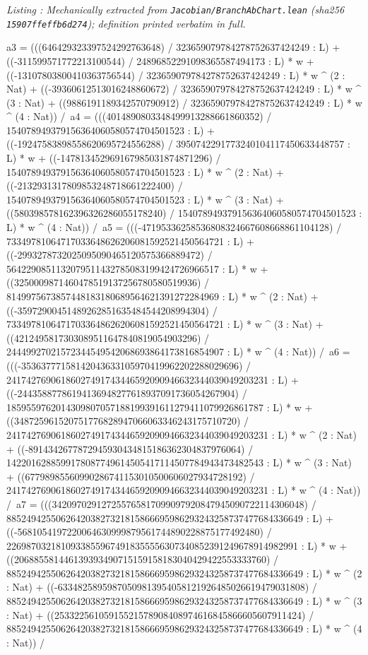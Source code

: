 \documentclass[a4paper,11pt]{article}
\newcounter{leanlisting}
\newenvironment{leanlisting}[2]{%
  \refstepcounter{leanlisting}\label{#2}%
  \begin{center}\textit{\small Listing \theleanlisting: #1}\end{center}%
  \Verbatim[breaklines=true,breakanywhere=true,fontsize=\footnotesize,frame=single,framesep=4pt,rulecolor=\color{gray!50},fillcolor=\color{gray!5}]%
}{%
  \endVerbatim%
}
\theoremstyle{plain}
\theoremstyle{definition}
\theoremstyle{remark}
\begin{document}
\begin{leanlisting}{Mechanically extracted from \texttt{Jacobian/BranchAbChart.lean} (sha256 \texttt{15907ffeffb6d274}); definition printed verbatim in full.}{ab:lst:def-chartclass}
      a3 = (((646429323397524292763648) / 323659079784278752637424249 : L) + ((-311599571772213100544) / 24896852291098365587494173 : L) * w + ((-13107803800410363756544) / 323659079784278752637424249 : L) * w ^ (2 : Nat) + ((-39360612513016248860672) / 323659079784278752637424249 : L) * w ^ (3 : Nat) + ((9886191189342570790912) / 323659079784278752637424249 : L) * w ^ (4 : Nat)) /\
      a4 = (((4014890803348499913288661860352) / 154078949379156364060580574704501523 : L) + ((-19247583898558620695724556288) / 3950742291773240104117450633448757 : L) * w + ((-147813452969167985031874871296) / 154078949379156364060580574704501523 : L) * w ^ (2 : Nat) + ((-2132931317809853248718661222400) / 154078949379156364060580574704501523 : L) * w ^ (3 : Nat) + ((580398578162396326286055178240) / 154078949379156364060580574704501523 : L) * w ^ (4 : Nat)) /\
      a5 = (((-47195336258536808324667608668861104128) / 73349781064717033648626206081592521450564721 : L) + ((-2993278732025095090465120575366889472) / 5642290851132079511432785083199424726966517 : L) * w + ((3250009871460478519137256780580519936) / 8149975673857448183180689564621391272284969 : L) * w ^ (2 : Nat) + ((-35972900451489262851635484544208994304) / 73349781064717033648626206081592521450564721 : L) * w ^ (3 : Nat) + ((4212495817303089511647840819054903296) / 24449927021572344549542068693864173816854907 : L) * w ^ (4 : Nat)) /\
      a6 = (((-35363777158142043633105970419962202288029696) / 24174276906186027491743446592090946632344039049203231 : L) + ((-24435887786194136948277618937091736054267904) / 1859559762014309807057188199391611279411079926861787 : L) * w + ((348725961520751776828947066063346243175710720) / 24174276906186027491743446592090946632344039049203231 : L) * w ^ (2 : Nat) + ((-8914342677872945930434815186362304837976064) / 1422016288599178087749614505417114507784943473482543 : L) * w ^ (3 : Nat) + ((67798985560990286741153010500606027934728192) / 24174276906186027491743446592090946632344039049203231 : L) * w ^ (4 : Nat)) /\
      a7 = (((342097029127255765817099097920847945090722114306048) / 885249425506264203827321815866695986293243258737477684336649 : L) + ((-5681054197220064630999879561744890228875177492480) / 22698703218109338559674918355556307340852391249678914982991 : L) * w + ((206885581446139393490715159158183040429422553333760) / 885249425506264203827321815866695986293243258737477684336649 : L) * w ^ (2 : Nat) + ((-63348258959870509813954058121926485026619479031808) / 885249425506264203827321815866695986293243258737477684336649 : L) * w ^ (3 : Nat) + ((25332256105915521578908408974616845866605607911424) / 885249425506264203827321815866695986293243258737477684336649 : L) * w ^ (4 : Nat)) /\

\end{leanlisting}
\end{document}
